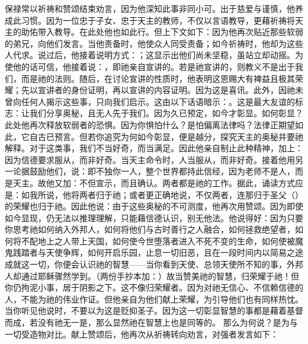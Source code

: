 保禄常以祈祷和赞颂结束劝言，因为他深知此事非同小可。出于慈爱与谨慎，他养成此习惯。因为一位忠于子女、忠于天主的教师，不仅以言语教导，更藉祈祷将天主的助佑带入教导。在此处他也如此行。但上下文如下：因为他再次贴近那些软弱的弟兄，向他们发言。当他责备时，他使众人同受责备；如今祈祷时，他却为这些人代求。说过后，他接着说明方式：；这显示出他们尚未坚稳，虽站立却动摇。为使他的话可信，他接着说：，即祂亲自宣讲的。若是祂宣讲的，则教义不是出于我们，而是祂的法则。随后，在讨论宣讲的性质时，他表明这恩赐大有裨益且极其荣耀；先以宣讲者的身份证明，再以宣讲的内容证明。因为这是喜讯。此外，因祂未曾向任何人揭示这些事，只向我们启示。这由以下话语暗示：。这是最大友谊的标志：让我们分享奥秘，且无人先于我们。因为久已预定，如今才彰显。如何彰显？此处他再次释放软弱者的恐惧。因为你惧怕什么？是怕偏离法律吗？法律正期望如此，它自古已预言。但若你追究为何如今彰显，便是越分，探究天主的奥秘并要祂解释。对于这类事，我们不当好奇，而当满足。因此他亲自制止此种精神，加上：因为信德要求服从，而非好奇。当天主命令时，人当服从，而非好奇。接着他用另一论据鼓励他们，说：即不独你一人，整个世界都持此信经，因为老师不是人，而是天主。故他又加：不但宣示，而且确认。两者都是祂的工作。据此，诵读方式应是：如我所说，他将两者归于祂；或者更正确地说，不仅两者，连那归于圣父（）的荣耀也归于祂。因此他说：由于这些奥秘的不可测度，他再次用赞颂。因为即使如今显现，仍无法以推理理解，只能藉信德认识，别无他法。他说得好：因为只要你思考祂如何纳入外邦人，如何将他们与古时善行之人融合，如何拯救绝望者，如何将不配地上之人带上天国，如何使今世堕落者进入不死不变的生命，如何使被魔鬼践踏者与天使争辉，如何开启乐园，止息一切旧恶，且在一段时间内以简易之途成就这一切，你便会认识祂的智慧——当你看到天使、总领天使所不知的事，外邦人却通过耶稣骤然学到。（两份手抄本加：）故当赞美祂的智慧，归荣耀于祂！但你仍拘泥小事，居于阴影之下。这不像归荣耀者。因为对祂无信心、不信赖信德的人，不能为祂的伟业作证。但他亲自为他们献上荣耀，为引导他们也有同样热忱。当你听见他说时，不要以为这是贬抑圣子。因为这一切彰显智慧的事都是藉着基督而成，若没有祂无一是，那么显然祂在智慧上也是同等的。 那么为何说？是为与一切受造物对比。献上赞颂后，他再次从祈祷转向劝言，对强者发言如下：\par

